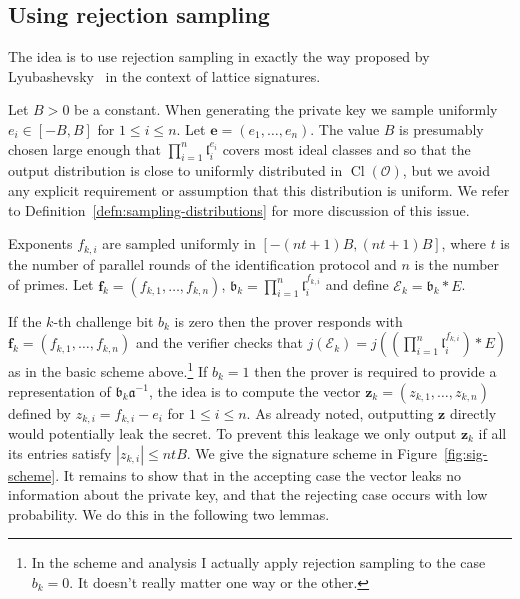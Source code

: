 \documentclass{llncs}
\newcommand{\E}{\mathcal{E}}
\newcommand{\OO}{\mathcal{O}}
\DeclareMathOperator{\Cl}{Cl}
\renewcommand{\a}{\mathfrak{a}}
\renewcommand{\b}{\mathfrak{b}}
\renewcommand{\l}{\mathfrak{l}}
\newcommand{\e}{\mathbf{e}}
\newcommand{\f}{\mathbf{f}}
\newcommand{\z}{\mathbf{z}}
\begin{document}
\subsection{Using rejection sampling}\label{sec:sig-reject-sample}

The idea is to use rejection sampling in exactly the way proposed by Lyubashevsky~\cite{Lyu09} in the context of lattice signatures.

Let $B > 0$ be a constant. When generating the private key we sample uniformly $e_i \in [-B, B]$ for $1 \le i \le n$. Let $\e = ( e_1, \dots, e_n )$.
The value $B$ is presumably chosen large enough that $\prod_{i=1}^n \l_i^{e_i}$ covers most ideal classes and so that the output distribution is close to uniformly distributed in $\Cl(\OO)$, but we avoid any explicit requirement or assumption that this distribution is uniform.
We refer to Definition~\ref{defn:sampling-distributions} for more discussion of this issue.

Exponents $f_{k,i}$ are sampled uniformly in $[-(nt+1)B, (nt+1)B]$, where $t$ is the number of parallel rounds of the identification protocol and $n$ is the number of primes.
Let $\f_k = (f_{k,1}, \dots, f_{k,n} )$, $\b_k = \prod_{i=1}^n \l_i^{f_{k,i}}$ and define $\E_k = \b_k * E $.


If the $k$-th challenge bit $b_k$ is zero then the prover responds with $\f_k = ( f_{k,1}, \dots, f_{k,n} )$ and the verifier checks that $j(\E_k) = j( (\prod_{i=1}^n \l_i^{f_{k,i}}) * E )$ as in the basic scheme above.\footnote{In the scheme and analysis I actually apply rejection sampling to the case $b_k = 0$. It doesn't really matter one way or the other.}
If $b_k = 1$ then the prover is required to provide a representation of $\b_k \a^{-1}$, the idea is to compute the vector $\z_k = (z_{k,1}, \dots, z_{k,n}) $ defined by $z_{k,i} = f_{k,i} - e_i $ for $1 \le i \le n$.
As already noted, outputting $\z$ directly would potentially leak the secret.
To prevent this leakage we only output $\z_k$ if all its entries satisfy $| z_{k,i} | \le nt B$.
We give the signature scheme in Figure~\ref{fig:sig-scheme}.
It remains to show that in the accepting case the vector leaks no information about the private key, and that the rejecting case occurs with low probability. We do this in the following two lemmas.
\end{document}
